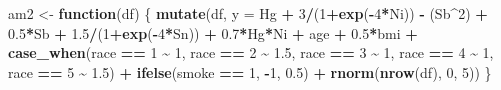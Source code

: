 \documentclass[12pt, twoside]{amherstthesis}
\newenvironment{Shaded}{\begin{snugshade}}{\end{snugshade}}
\newcommand{\AttributeTok}[1]{\textcolor[rgb]{0.13,0.29,0.53}{#1}}
\newcommand{\ControlFlowTok}[1]{\textcolor[rgb]{0.13,0.29,0.53}{\textbf{#1}}}
\newcommand{\DecValTok}[1]{\textcolor[rgb]{0.00,0.00,0.81}{#1}}
\newcommand{\FloatTok}[1]{\textcolor[rgb]{0.00,0.00,0.81}{#1}}
\newcommand{\FunctionTok}[1]{\textcolor[rgb]{0.13,0.29,0.53}{\textbf{#1}}}
\newcommand{\NormalTok}[1]{#1}
\newcommand{\OtherTok}[1]{\textcolor[rgb]{0.56,0.35,0.01}{#1}}
\newcommand{\SpecialCharTok}[1]{\textcolor[rgb]{0.81,0.36,0.00}{\textbf{#1}}}
\begin{document}
\begin{Shaded}
\begin{Highlighting}[]
\NormalTok{am2 }\OtherTok{\textless{}{-}} \ControlFlowTok{function}\NormalTok{(df) \{}
  \FunctionTok{mutate}\NormalTok{(df, }\AttributeTok{y =} 
\NormalTok{           Hg }\SpecialCharTok{+} \DecValTok{3}\SpecialCharTok{/}\NormalTok{(}\DecValTok{1}\SpecialCharTok{+}\FunctionTok{exp}\NormalTok{(}\SpecialCharTok{{-}}\DecValTok{4}\SpecialCharTok{*}\NormalTok{Ni)) }\SpecialCharTok{{-}}\NormalTok{ (Sb}\SpecialCharTok{\^{}}\DecValTok{2}\NormalTok{) }\SpecialCharTok{+} \FloatTok{0.5}\SpecialCharTok{*}\NormalTok{Sb }\SpecialCharTok{+} \FloatTok{1.5}\SpecialCharTok{/}\NormalTok{(}\DecValTok{1}\SpecialCharTok{+}\FunctionTok{exp}\NormalTok{(}\SpecialCharTok{{-}}\DecValTok{4}\SpecialCharTok{*}\NormalTok{Sn)) }\SpecialCharTok{+} 
           \FloatTok{0.7}\SpecialCharTok{*}\NormalTok{Hg}\SpecialCharTok{*}\NormalTok{Ni }\SpecialCharTok{+} 
\NormalTok{           age }\SpecialCharTok{+} \FloatTok{0.5}\SpecialCharTok{*}\NormalTok{bmi }\SpecialCharTok{+} 
           \FunctionTok{case\_when}\NormalTok{(race }\SpecialCharTok{==} \DecValTok{1} \SpecialCharTok{\textasciitilde{}} \DecValTok{1}\NormalTok{, }
\NormalTok{                     race }\SpecialCharTok{==} \DecValTok{2} \SpecialCharTok{\textasciitilde{}} \FloatTok{1.5}\NormalTok{, }
\NormalTok{                     race }\SpecialCharTok{==} \DecValTok{3} \SpecialCharTok{\textasciitilde{}} \DecValTok{1}\NormalTok{, }
\NormalTok{                     race }\SpecialCharTok{==} \DecValTok{4} \SpecialCharTok{\textasciitilde{}} \DecValTok{1}\NormalTok{, }
\NormalTok{                     race }\SpecialCharTok{==} \DecValTok{5} \SpecialCharTok{\textasciitilde{}} \FloatTok{1.5}\NormalTok{) }\SpecialCharTok{+}
           \FunctionTok{ifelse}\NormalTok{(smoke }\SpecialCharTok{==} \DecValTok{1}\NormalTok{, }\SpecialCharTok{{-}}\DecValTok{1}\NormalTok{, }\FloatTok{0.5}\NormalTok{) }\SpecialCharTok{+}
           \FunctionTok{rnorm}\NormalTok{(}\FunctionTok{nrow}\NormalTok{(df), }\DecValTok{0}\NormalTok{, }\DecValTok{5}\NormalTok{))}
\NormalTok{\}}


\end{Highlighting}
\end{Shaded}
\end{document}
